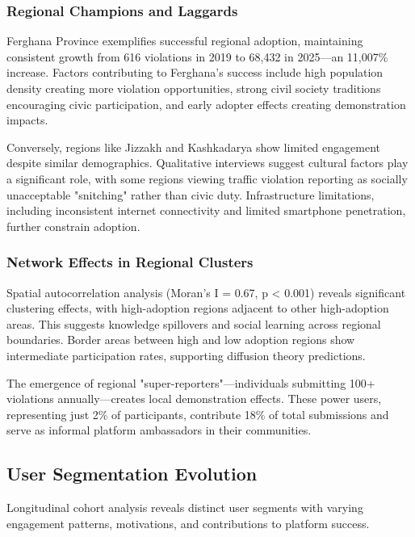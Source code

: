 \documentclass[pdflatex,sn-mathphys-num]{sn-jnl}%
\theoremstyle{thmstyleone}%
\theoremstyle{thmstyletwo}%
\theoremstyle{thmstylethree}%
\begin{document}
\subsubsection{Regional Champions and Laggards}

Ferghana Province exemplifies successful regional adoption, maintaining consistent growth from 616 violations in 2019 to 68,432 in 2025—an 11,007\% increase. Factors contributing to Ferghana's success include high population density creating more violation opportunities, strong civil society traditions encouraging civic participation, and early adopter effects creating demonstration impacts.

Conversely, regions like Jizzakh and Kashkadarya show limited engagement despite similar demographics. Qualitative interviews suggest cultural factors play a significant role, with some regions viewing traffic violation reporting as socially unacceptable "snitching" rather than civic duty. Infrastructure limitations, including inconsistent internet connectivity and limited smartphone penetration, further constrain adoption.

\subsubsection{Network Effects in Regional Clusters}

Spatial autocorrelation analysis (Moran's I = 0.67, p < 0.001) reveals significant clustering effects, with high-adoption regions adjacent to other high-adoption areas. This suggests knowledge spillovers and social learning across regional boundaries. Border areas between high and low adoption regions show intermediate participation rates, supporting diffusion theory predictions.

The emergence of regional "super-reporters"—individuals submitting 100+ violations annually—creates local demonstration effects. These power users, representing just 2\% of participants, contribute 18\% of total submissions and serve as informal platform ambassadors in their communities.

\subsection{User Segmentation Evolution}\label{subsec15}

Longitudinal cohort analysis reveals distinct user segments with varying engagement patterns, motivations, and contributions to platform success.
\end{document}
